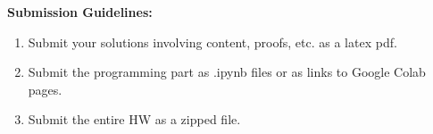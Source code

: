 \documentclass{article}
\begin{document}
\textbf{Submission Guidelines:}
\begin{enumerate}
	\item Submit your solutions involving content, proofs, etc. as a latex pdf. 
	\item Submit the programming part as .ipynb files or as links to Google Colab pages. 
	\item Submit the entire HW as a zipped file.
\end{enumerate}
\end{document}
